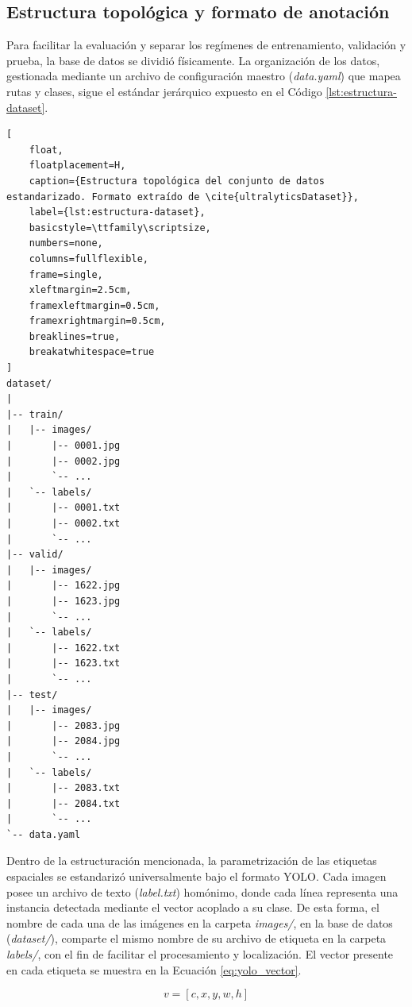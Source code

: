 \subsection{Estructura topológica y formato de anotación}

Para facilitar la evaluación y separar los regímenes de entrenamiento, validación y prueba, la base de datos se dividió físicamente. La organización de los datos, gestionada mediante un archivo de configuración maestro (\textit{data.yaml}) que mapea rutas y clases, sigue el estándar jerárquico expuesto en el Código \ref{lst:estructura-dataset}.\\

\begin{lstlisting}[
    float,
    floatplacement=H,                               
    caption={Estructura topológica del conjunto de datos estandarizado. Formato extraído de \cite{ultralyticsDataset}},
    label={lst:estructura-dataset},
    basicstyle=\ttfamily\scriptsize,
    numbers=none,
    columns=fullflexible,
    frame=single,
    xleftmargin=2.5cm,
    framexleftmargin=0.5cm,
    framexrightmargin=0.5cm,
    breaklines=true,
    breakatwhitespace=true
]
dataset/
|
|-- train/
|   |-- images/
|       |-- 0001.jpg
|       |-- 0002.jpg
|       `-- ...
|   `-- labels/
|       |-- 0001.txt
|       |-- 0002.txt
|       `-- ...
|-- valid/
|   |-- images/
|       |-- 1622.jpg
|       |-- 1623.jpg
|       `-- ...
|   `-- labels/
|       |-- 1622.txt
|       |-- 1623.txt
|       `-- ...
|-- test/
|   |-- images/
|       |-- 2083.jpg
|       |-- 2084.jpg
|       `-- ...
|   `-- labels/
|       |-- 2083.txt
|       |-- 2084.txt
|       `-- ...
`-- data.yaml
\end{lstlisting}

Dentro de la estructuración mencionada, la parametrización de las etiquetas espaciales se estandarizó universalmente bajo el formato YOLO. Cada imagen posee un archivo de texto (\textit{label.txt}) homónimo, donde cada línea representa una instancia detectada mediante el vector acoplado a su clase. De esta forma, el nombre de cada una de las imágenes en la carpeta \textit{images/}, en la base de datos (\textit{dataset/}), comparte el mismo nombre de su archivo de etiqueta en la carpeta \textit{labels/}, con el fin de facilitar el procesamiento y localización. El vector presente en cada etiqueta se muestra en la Ecuación \ref{eq:yolo_vector}.

\begin{equation}
    v = [c, x, y, w, h]
    \label{eq:yolo_vector}
\end{equation}

